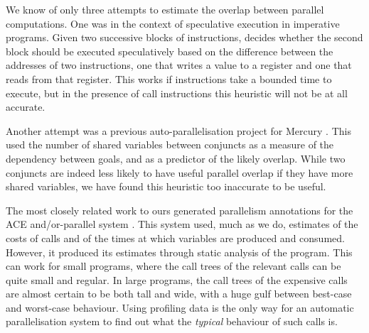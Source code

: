 We know of only three attempts to estimate the overlap
between parallel computations.
One was in the context of speculative execution in imperative programs.
Given two successive blocks of instructions,
\cite{von_Praun:2007:implicit_parallelism_with_ordered_transactions}
decides whether the second block should be executed speculatively
based on the difference between the addresses of two instructions,
one that writes a value to a register and one that reads from that register.
This works if instructions take a bounded time to execute,
but in the presence of call instructions
this heuristic will not be at all accurate.

Another attempt was a previous auto-parallelisation project for
Mercury \cite{tannier:2007:parallel_mercury}.
This used the number of shared variables between conjuncts
as a measure of the dependency between goals,
and as a predictor of the likely overlap.
While two conjuncts are indeed less likely
to have useful parallel overlap if they have more shared variables,
we have found this heuristic too inaccurate to be useful.

The most closely related work to ours
generated parallelism annotations for the ACE and/or-parallel system
\cite{Pontelli97automaticcompile-time}.
This system used, much as we do,
estimates of the costs of calls
and of the times at which variables are produced and consumed.
However, it produced its estimates through static analysis of the program.
This can work for small programs,
where the call trees of the relevant calls can be quite small and regular.
In large programs, the call trees of the expensive calls
are almost certain to be both tall and wide,
with a huge gulf between best-case and worst-case behaviour.
Using profiling data is the only way
for an automatic parallelisation system to find out
what the \emph{typical} behaviour of such calls is.


